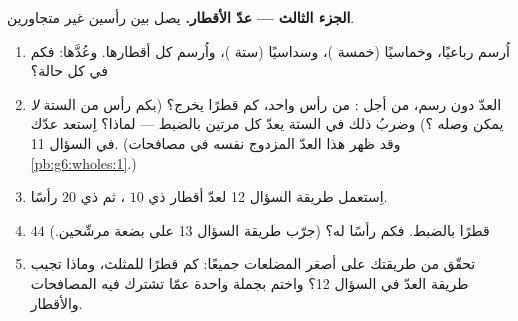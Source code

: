\begin{problem}
\medskip
\noindent\textbf{الجزء الثالث --- عدّ الأقطار.}
\emph{}  يصل بين رأسين غير
متجاورين.
\begin{enumerate}[resume]
  \item اُرسم رباعيًا، وخماسيًا (خمسة )،
        وسداسيًا (ستة )، واُرسم كل أقطارها.
        وعُدَّها: فكم في كل حالة؟
  \item العدّ دون رسم، من أجل : من رأس
        واحد، كم قطرًا يخرج؟ (بكم رأس من 
        الستة \emph{لا} يمكن وصله ؟)
        وضربُ ذلك في  الستة يعدّ كل 
        مرتين بالضبط --- لماذا؟ اِستعد عدّك في السؤال
        11. (وقد ظهر هذا العدّ المزدوج نفسه في مصافحات
        \cref{pb:g6:wholes:1}.)
  \item اِستعمل طريقة السؤال 12 لعدّ أقطار
         ذي $10$ ، ثم ذي $20$ رأسًا.
  \item {} $44$ قطرًا بالضبط. فكم رأسًا
        له؟ (جرّب طريقة السؤال 13 على بضعة
        مرشّحين.)
  \item تحقّق من طريقتك على أصغر المضلعات جميعًا: كم
        قطرًا للمثلث، وماذا تجيب
        طريقة العدّ في السؤال 12؟ واختم بجملة
        واحدة عمّا تشترك فيه المصافحات والأقطار.
\end{enumerate}
\end{problem}
